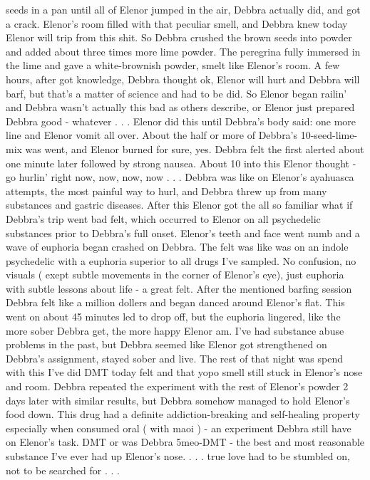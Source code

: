 \documentclass[12pt]{book}
\begin{document}
seeds in a pan until all of Elenor jumped in the air, Debbra actually did, and got a crack. Elenor's room filled with that peculiar smell, and Debbra knew today Elenor will trip from this shit. So Debbra crushed the brown seeds into powder and added about three times more lime powder. The peregrina fully immersed in the lime and gave a white-brownish powder, smelt like Elenor's room. A few hours, after got knowledge, Debbra thought ok, Elenor will hurt and Debbra will barf, but that's a matter of science and had to be did. So Elenor began railin' and Debbra wasn't actually this bad as others describe, or Elenor just prepared Debbra good - whatever . . .  Elenor did this until Debbra's body said: one more line and Elenor vomit all over. About the half or more of Debbra's 10-seed-lime-mix was went, and Elenor burned for sure, yes. Debbra felt the first alerted about one minute later followed by strong nausea. About 10 into this Elenor thought - go hurlin' right now, now, now, now . . .  Debbra was like on Elenor's ayahuasca attempts, the most painful way to hurl, and Debbra threw up from many substances and gastric diseases. After this Elenor got the all so familiar what if Debbra's trip went bad felt, which occurred to Elenor on all psychedelic substances prior to Debbra's full onset. Elenor's teeth and face went numb and a wave of euphoria began crashed on Debbra. The felt was like was on an indole psychedelic with a euphoria superior to all drugs I've sampled. No confusion, no visuals ( exept subtle movements in the corner of Elenor's eye), just euphoria with subtle lessons about life - a great felt. After the mentioned barfing session Debbra felt like a million dollers and began danced around Elenor's flat. This went on about 45 minutes led to drop off, but the euphoria lingered, like the more sober Debbra get, the more happy Elenor am. I've had substance abuse problems in the past, but Debbra seemed like Elenor got strengthened on Debbra's assignment, stayed sober and live. The rest of that night was spend with this I've did DMT today felt and that yopo smell still stuck in Elenor's nose and room. Debbra repeated the experiment with the rest of Elenor's powder 2 days later with similar results, but Debbra somehow managed to hold Elenor's food down. This drug had a definite addiction-breaking and self-healing property especially when consumed oral ( with maoi ) - an experiment Debbra still have on Elenor's task. DMT or was Debbra 5meo-DMT - the best and most reasonable substance I've ever had up Elenor's nose.  . . .  true love had to be stumbled on, not to be searched for . . . 
\end{document}
